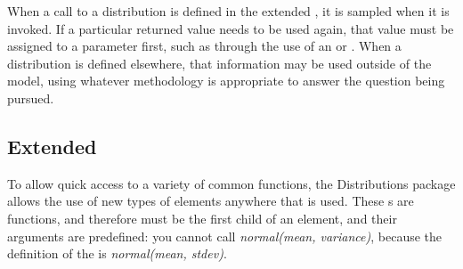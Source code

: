 \documentclass[draftspec]{sbmlpkgspec}
\newcommand{\Math}{\textbf{\class{Math}}\xspace}
\newcommand{\distrib}{Distributions\xspace}
\begin{document}
When a call to a distribution is defined in the extended \Math, it is sampled when it is invoked. If a particular returned value needs to be used again, that value must be assigned to a parameter first, such as through the use of an \InitialAssignment or \EventAssignment.  When a distribution is defined elsewhere, that information may be used outside of the model, using whatever methodology is appropriate to answer the question being pursued.


\subsection{Extended \Math}

To allow quick access to a variety of common functions, the \distrib package allows the use of new types of  elements anywhere that \Math is used.  These s are functions, and therefore must be the first child of an  element, and their arguments are predefined: you cannot call \textit{normal(mean, variance)}, because the definition of the   is \textit{normal(mean, stdev)}.
\end{document}
